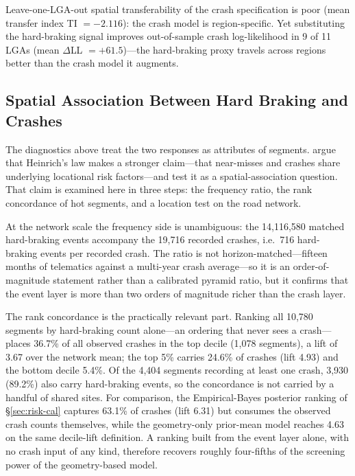 \documentclass[letterpaper,8pt]{extarticle}  %
\begin{document}
\begin{doublespacing}
\begin{linenumbers}
Leave-one-LGA-out spatial transferability of the crash specification is poor (mean transfer index TI $=-2.116$): the crash model is region-specific. Yet substituting the hard-braking signal improves out-of-sample crash log-likelihood in 9 of 11 LGAs (mean $\Delta$LL $=+61.5$)---the hard-braking proxy travels across regions better than the crash model it augments.



\FloatBarrier


\subsection{Spatial Association Between Hard Braking and Crashes}\label{sec:crossk-results}

The diagnostics above treat the two responses as attributes of segments. \citet{Park2023Heinrich} argue that Heinrich's law makes a stronger claim---that near-misses and crashes share underlying locational risk factors---and test it as a spatial-association question. That claim is examined here in three steps: the frequency ratio, the rank concordance of hot segments, and a location test on the road network.

At the network scale the frequency side is unambiguous: the 14,116,580 matched hard-braking events accompany the 19,716 recorded crashes, i.e.\ 716 hard-braking events per recorded crash. The ratio is not horizon-matched---fifteen months of telematics against a multi-year crash average---so it is an order-of-magnitude statement rather than a calibrated pyramid ratio, but it confirms that the event layer is more than two orders of magnitude richer than the crash layer.

The rank concordance is the practically relevant part. Ranking all 10,780 segments by hard-braking count alone---an ordering that never sees a crash---places 36.7\% of all observed crashes in the top decile (1,078 segments), a lift of 3.67 over the network mean; the top 5\% carries 24.6\% of crashes (lift 4.93) and the bottom decile 5.4\%. Of the 4,404 segments recording at least one crash, 3,930 (89.2\%) also carry hard-braking events, so the concordance is not carried by a handful of shared sites. For comparison, the Empirical-Bayes posterior ranking of \S\ref{sec:risk-cal} captures 63.1\% of crashes (lift 6.31) but consumes the observed crash counts themselves, while the geometry-only prior-mean model reaches 4.63 on the same decile-lift definition. A ranking built from the event layer alone, with no crash input of any kind, therefore recovers roughly four-fifths of the screening power of the geometry-based model.


\end{linenumbers}
\end{doublespacing}
\end{document}
